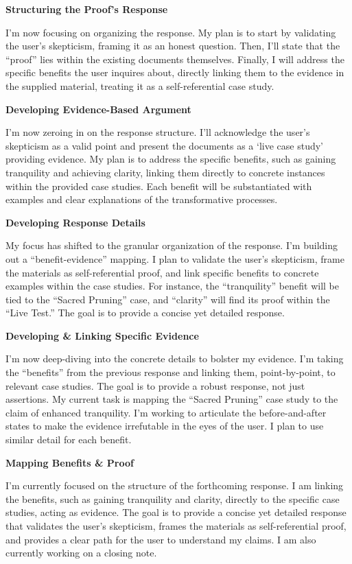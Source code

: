 \documentclass{article}
\begin{document}
\textbf{Structuring the Proof's Response}

I'm now focusing on organizing the response. My plan is to start by validating the user's skepticism, framing it as an honest question. Then, I'll state that the ``proof'' lies within the existing documents themselves. Finally, I will address the specific benefits the user inquires about, directly linking them to the evidence in the supplied material, treating it as a self-referential case study.

\textbf{Developing Evidence-Based Argument}

I'm now zeroing in on the response structure. I'll acknowledge the user's skepticism as a valid point and present the documents as a `live case study' providing evidence. My plan is to address the specific benefits, such as gaining tranquility and achieving clarity, linking them directly to concrete instances within the provided case studies. Each benefit will be substantiated with examples and clear explanations of the transformative processes.

\textbf{Developing Response Details}

My focus has shifted to the granular organization of the response. I'm building out a ``benefit-evidence'' mapping. I plan to validate the user's skepticism, frame the materials as self-referential proof, and link specific benefits to concrete examples within the case studies. For instance, the ``tranquility'' benefit will be tied to the ``Sacred Pruning'' case, and ``clarity'' will find its proof within the ``Live Test.'' The goal is to provide a concise yet detailed response.

\textbf{Developing \& Linking Specific Evidence}

I'm now deep-diving into the concrete details to bolster my evidence. I'm taking the ``benefits'' from the previous response and linking them, point-by-point, to relevant case studies. The goal is to provide a robust response, not just assertions. My current task is mapping the ``Sacred Pruning'' case study to the claim of enhanced tranquility. I'm working to articulate the before-and-after states to make the evidence irrefutable in the eyes of the user. I plan to use similar detail for each benefit.

\textbf{Mapping Benefits \& Proof}

I'm currently focused on the structure of the forthcoming response. I am linking the benefits, such as gaining tranquility and clarity, directly to the specific case studies, acting as evidence. The goal is to provide a concise yet detailed response that validates the user's skepticism, frames the materials as self-referential proof, and provides a clear path for the user to understand my claims. I am also currently working on a closing note.
\end{document}

